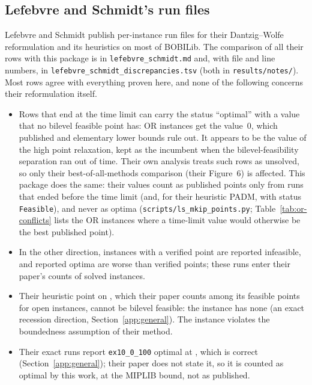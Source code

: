 \subsection{Lefebvre and Schmidt's run files}\label{app:ls}

Lefebvre and Schmidt publish per-instance run files for their Dantzig--Wolfe
reformulation and its heuristics on most of BOBILib.\cite{lefebvre2025dantzig}
The comparison of all their rows with this package is in
\texttt{lefebvre\_schmidt.md} and, with file and line numbers, in
\texttt{lefebvre\_schmidt\_discrepancies.tsv} (both in \texttt{results/notes/}).
Most rows agree with everything
proven here, and none of the following concerns their reformulation itself.
\begin{itemize}
\item Rows that end at the time limit can carry the status ``optimal'' with a
value that no bilevel feasible point has: \LsOrZeroOptimal{} OR instances get the
value~0, which published and elementary lower bounds rule out. It appears to be
the value of the high point relaxation, kept as the incumbent when the
bilevel-feasibility separation ran out of time. Their own analysis treats such
rows as unsolved, so only their best-of-all-methods comparison (their Figure~6)
is affected. This package does the same: their values count as published
points only from runs that ended before the time limit (and, for their
heuristic PADM, with status \texttt{Feasible}), and never as optima
(\texttt{scripts/ls\_mkip\_points.py}; Table~\ref{tab:or-conflicts} lists the
OR instances where a time-limit value would otherwise be the best published
point).
\item In the other direction, \LsInfeasibleVerifiedPoint{} instances with a
verified point are reported infeasible, and \LsWrongOptima{} reported optima are
worse than verified points; these runs enter their paper's counts of solved
instances.
\item Their heuristic point on \texttt{\LsBadPadmName}, which their paper counts
among its feasible points for open instances, cannot be bilevel feasible: the
instance has none (an exact recession direction, Section~\ref{app:general}). The
instance violates the boundedness assumption of their method.
\item Their exact runs report \texttt{ex10\_0\_100} optimal at
\ExTenOptimum{}, which is correct (Section~\ref{app:general}); their paper does not
state it, so it is counted as optimal by this work, at the MIPLIB bound, not as
published.
\end{itemize}

